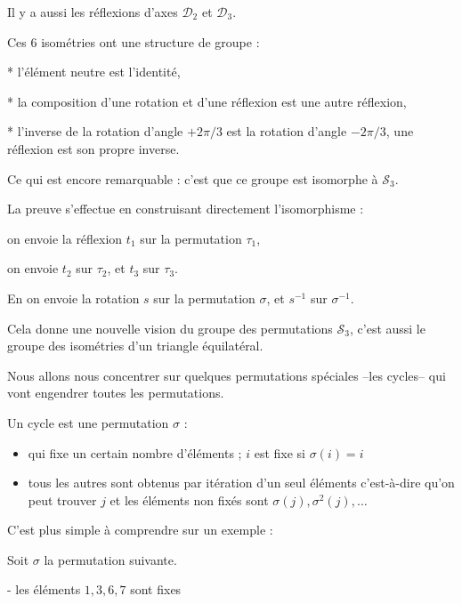 Il y a aussi les réflexions d'axes $\mathcal{D}_2$ et $\mathcal{D}_3$.

\change

Ces $6$ isométries ont une structure de groupe :

  * l'élément neutre est l'identité,

  * la composition d'une rotation et d'une réflexion est une autre réflexion,
  
  * l'inverse de la rotation d'angle $+2\pi/3$ est la rotation d'angle $-2\pi/3$,
une réflexion est son propre inverse.


\change

Ce qui est encore remarquable : c'est que ce groupe est isomorphe à $\mathcal{S}_3$.

La preuve s'effectue en construisant directement l'isomorphisme :

on envoie la réflexion $t_1$ sur la permutation $\tau_1$,

on envoie $t_2$ sur $\tau_2$, et $t_3$ sur $\tau_3$.

En on envoie la rotation $s$ sur la permutation $\sigma$,
et $s^{-1}$ sur $\sigma^{-1}$.


Cela donne une nouvelle vision du groupe des permutations $\mathcal{S}_3$,
c'est aussi le groupe des isométries d'un triangle équilatéral.



\diapo


Nous allons nous concentrer sur quelques permutations spéciales --les cycles--
qui vont engendrer toutes les permutations.

Un cycle est une permutation $\sigma$ :
 
\begin{itemize}
  \item qui fixe un certain nombre d'éléments ; $i$ est fixe si $\sigma(i)=i$
  \item tous les autres sont obtenus par itération d'un seul éléments c'est-à-dire 
qu'on peut trouver $j$ et les éléments non fixés sont $\sigma(j),\sigma^2(j),\ldots$
\end{itemize}

\change

C'est plus simple à comprendre sur un exemple :

Soit $\sigma$ la permutation suivante.

\change

  - les éléments $1, 3, 6, 7$ sont fixes

